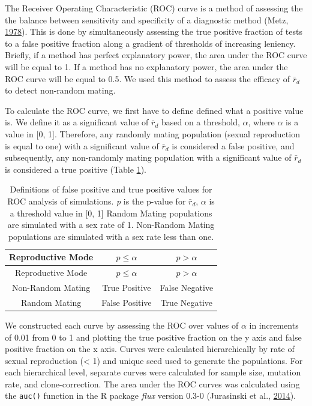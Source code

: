 \documentclass[double,12pt]{beavtex}
\begin{document}
  The Receiver Operating Characteristic (ROC) curve is a method of
  assessing the the balance between sensitivity and specificity of a
  diagnostic method (Metz, \protect\hyperlink{ref-metz1978basic}{1978}).
  This is done by simultaneously assessing the true positive fraction of
  tests to a false positive fraction along a gradient of thresholds of
  increasing leniency. Briefly, if a method has perfect explanatory power,
  the area under the ROC curve will be equal to 1. If a method has no
  explanatory power, the area under the ROC curve will be equal to 0.5. We
  used this method to assess the efficacy of \(\bar{r}_d\) to detect
  non-random mating.
  
  To calculate the ROC curve, we first have to define defined what a
  positive value is. We define it as a significant value of \(\bar{r}_d\)
  based on a threshold, \(\alpha\), where \(\alpha\) is a value in {[}0,
  1{]}. Therefore, any randomly mating population (sexual reproduction is
  equal to one) with a significant value of \(\bar{r}_d\) is considered a
  false positive, and subsequently, any non-randomly mating population
  with a significant value of \(\bar{r}_d\) is considered a true positive
  (Table \ref{tab:simtab1}).
  
  \begin{longtable}[]{@{}ccc@{}}
  \caption{\label{tab:simtab1} Definitions of false positive and true positive
  values for ROC analysis of simulations. \emph{p} is the p-value for
  \(\bar{r}_d\), \(\alpha\) is a threshold value in {[}0, 1{]} Random
  Mating populations are simulated with a sex rate of 1. Non-Random Mating
  populations are simulated with a sex rate less than one.}\tabularnewline
  \toprule
  Reproductive Mode & \(p \leq \alpha\) & \(p > \alpha\)\tabularnewline
  \midrule
  \endfirsthead
  \toprule
  Reproductive Mode & \(p \leq \alpha\) & \(p > \alpha\)\tabularnewline
  \midrule
  \endhead
  Non-Random Mating & True Positive & False Negative\tabularnewline
  Random Mating & False Positive & True Negative\tabularnewline
  \bottomrule
  \end{longtable}
  
  We constructed each curve by assessing the ROC over values of \(\alpha\)
  in increments of 0.01 from 0 to 1 and plotting the true positive
  fraction on the y axis and false positive fraction on the x axis. Curves
  were calculated hierarchically by rate of sexual reproduction
  (\textless{} 1) and unique seed used to generate the populations. For
  each hierarchical level, separate curves were calculated for sample
  size, mutation rate, and clone-correction. The area under the ROC curves
  was calculated using the \texttt{auc()} function in the R package
  \emph{flux} version 0.3-0 (Jurasinski et al.,
  \protect\hyperlink{ref-jurasinski2014flux}{2014}).
  
\end{document}
